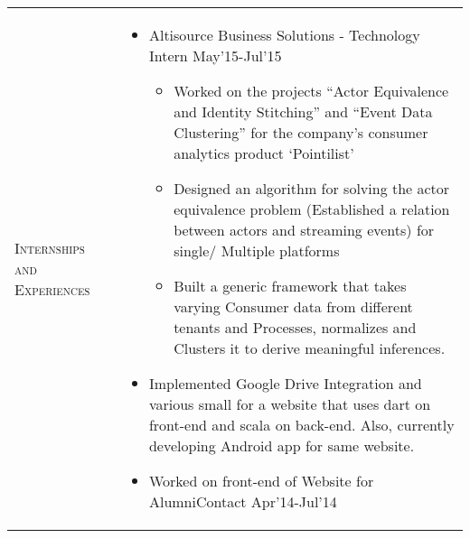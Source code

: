 \documentclass[a4paper]{article}
\begin{document}
\begin{longtable}{@{}m{3.0cm}m{14cm}@{}}
  \textrm{\textsc{Internships and Experiences}} &
                                                  \begin{itemize} 
                                                  \item 
                                                    Altisource Business Solutions - Technology Intern \hfill  May'15-Jul'15
                                                    \begin{itemize} \itemsep -2pt
                                                    \item Worked on the projects ``Actor Equivalence and Identity Stitching'' and ``Event Data Clustering''
                                                      for the company's consumer analytics product `Pointilist'
                                                    \item Designed an algorithm for solving the actor equivalence problem (Established a relation between
                                                      actors and streaming events) for single/ Multiple platforms
                                                    \item Built a generic
                                                      framework that takes varying
                                                      Consumer data from
                                                      different tenants and
                                                      Processes, normalizes and
                                                      Clusters it to derive
                                                      meaningful inferences.
                                                    \end{itemize}
                                                  \item
                                                    Implemented Google Drive
                                                    Integration and various
                                                    small  for a website
                                                    that uses dart on front-end
                                                    and scala on back-end. Also, currently
                                                    developing Android app for
                                                    same website.
                                                  \item
                                                    Worked on front-end of Website for AlumniContact \hfill Apr'14-Jul'14  \newline 

\end{itemize}
\end{longtable}
\end{document}
